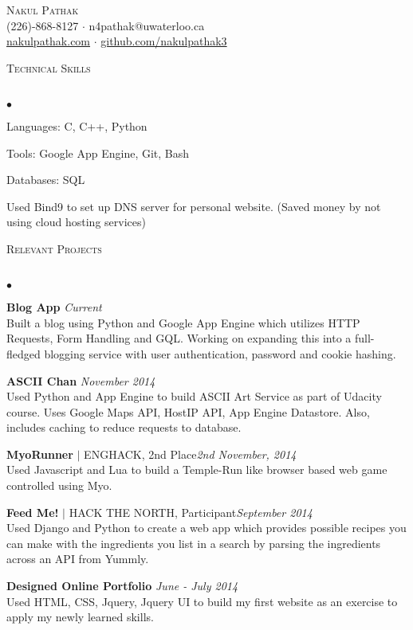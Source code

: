 \documentclass{article}
\newcommand{\lineunder}{\vspace*{-8pt} \\ \hspace*{-18pt} \hrulefill \\}
\newcommand{\header}[1]{{\hspace*{-15pt}\vspace*{6pt} \textsc{#1}} \vspace*{-6pt} \lineunder}
\newenvironment{achievements}{\begin{list}{$\bullet$}{\topsep 0pt \itemsep -1.5pt \leftmargin 5pt}}{\vspace*{4pt}\end{list}}
\begin{document}
\small
\smallskip
\vspace*{-45pt}

\begin{center}
	{\huge \scshape {Nakul Pathak}} \\
\vspace*{6pt} 
(226)-868-8127 $\cdot$ n4pathak@uwaterloo.ca \\
\vspace{1.5pt}
  \url{nakulpathak.com}  $\cdot$ \url{github.com/nakulpathak3}
\end{center}


\vspace{-10pt}
\header{\normalsize Technical Skills}
\begin{achievements}
\item Languages: C, C++, Python
\item Tools: Google App Engine, Git, Bash
\item Databases: SQL
\item Used Bind9 to set up DNS server for personal website. (Saved money by not using cloud hosting services)
\end{achievements}

\vspace{7pt}

\header{\normalsize Relevant Projects}
\begin{achievements}
\item \textbf{Blog App}  \hfill \textit {Current}
\\ Built a blog using Python and Google App Engine which utilizes HTTP Requests, Form Handling and GQL. Working on expanding this into a full-fledged blogging service with user authentication, password and cookie hashing.
\item \textbf{ASCII Chan} \hfill \textit {November 2014}
\\ Used Python and App Engine to build ASCII Art Service as part of Udacity course. Uses Google Maps API, HostIP API, App Engine Datastore. Also, includes caching to reduce requests to database. 
\item\textbf{MyoRunner} {$|$ \scriptsize ENGHACK, 2nd Place}\hfill\textit{2nd November, 2014}
\\ Used Javascript and Lua to build a Temple-Run like browser based web game controlled using Myo.
\item \textbf{Feed Me!} {$|$ \scriptsize HACK THE NORTH, Participant}\hfill \textit {September 2014}
\\ Used Django and Python to create a web app which provides possible recipes you can make with the ingredients you list in a search by parsing the ingredients across an API from Yummly.
\item \textbf{Designed Online Portfolio} \hfill \textit {June - July 2014}
\\ Used HTML, CSS, Jquery, Jquery UI to build my first website as an exercise to apply my newly learned skills.
\end{achievements}
\end{document}
